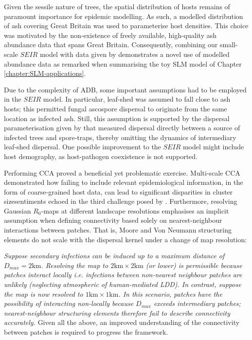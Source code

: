Given the sessile nature of trees, the spatial distribution of hosts remains of paramount importance for epidemic modelling.
As such, a modelled distribution of ash covering Great Britain was used to parameterise host densities.
This choice was motivated by the non-existence of freely available, high-quality ash abundance data that spans Great Britain.
Consequently, combining our small-scale $SEIR$ model with data given by \cite{hill.data} demonstrates a novel use of modelled abundance data\textemdash
as remarked when summarising the toy SLM model of Chapter \ref{chapter:SLM-applications}.

Due to the complexity of ADB, some important assumptions had to be employed in the $SEIR$ model.
In particular, leaf-shed was assumed to fall close to ash hosts; 
this permitted fungal ascospore dispersal to originate from the same location as infected ash.
Still, this assumption is supported by the dispersal parameterisation given by \cite{grosdidier2018tracking} that measured dispersal directly between a source of infected trees and spore-traps, thereby omitting the dynamics of intermediary leaf-shed dispersal.
One possible improvement to the $SEIR$ model might include host demography, as host-pathogen coexistence is not supported.

Performing CCA proved a beneficial yet problematic exercise.
Multi-scale CCA demonstrated how failing to include relevant epidemiological information, in the form of coarse-grained host data, can lead to significant disparities in cluster size\textemdash sentiments echoed in the third challenge posed by \cite{13-challenges}.
Furthermore, resolving Gaussian $R_0$-maps at different landscape resolutions emphasises an implicit assumption when defining connectivity based solely on nearest-neighbour interactions between patches. 
That is, Moore and Von Neumann structuring elements do not scale with the dispersal kernel under a change of map resolution:

\textit{Suppose secondary infections can be induced up to a maximum distance of $D_{max} = 2\mathrm{km}$.
Resolving the map to $\mathrm{2km \times 2km}$ (or lower) is permissible because patches interact locally i.e. infections between non-nearest neighbour patches are unlikely (neglecting atmospheric of human-mediated LDD).
In contrast, suppose the map is now resolved to $\mathrm{1km \times 1km}$.
In this scenario, patches have the possibility of interacting non-locally because $D_{max}$ exceeds intermediary patches;
nearest-neighbour structuring elements therefore fail to describe connectivity accurately.}
Given all the above, an improved understanding of the connectivity between patches is required to progress the framework.

